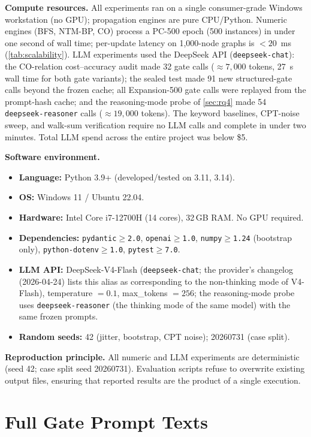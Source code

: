 \documentclass{article}
\theoremstyle{definition}
\begin{document}
\textbf{Compute resources.}  All experiments ran on a single
consumer-grade Windows workstation (no GPU); propagation engines
are pure CPU/Python.  Numeric engines (BFS, NTM-BP, CO) process a
PC-500 epoch (500 instances) in under one second of wall time;
per-update latency on 1{,}000-node graphs is $<20$~ms
(\cref{tab:scalability}).  LLM experiments used the DeepSeek
API (\texttt{deepseek-chat}): the CO-relation cost--accuracy audit made 32 gate calls
($\approx 7{,}000$ tokens, 27~s wall time for both gate variants); the
sealed test made 91 new structured-gate calls beyond the frozen cache;
all Expansion-500 gate calls were replayed from the prompt-hash cache;
and the reasoning-mode probe of \cref{sec:rq4} made 54
\texttt{deepseek-reasoner} calls ($\approx 19{,}000$ tokens).  The
keyword baselines, CPT-noise sweep, and walk-sum verification require
no LLM calls and complete in under two minutes.  Total LLM spend across
the entire project was below \$5.

\textbf{Software environment.}
\begin{itemize}
\item \textbf{Language:} Python 3.9+ (developed/tested on 3.11, 3.14).
\item \textbf{OS:} Windows 11 / Ubuntu 22.04.
\item \textbf{Hardware:} Intel Core i7-12700H (14 cores), 32\,GB RAM. No GPU required.
\item \textbf{Dependencies:} \texttt{pydantic$\ge$2.0},
  \texttt{openai$\ge$1.0}, \texttt{numpy$\ge$1.24} (bootstrap only),
  \texttt{python-dotenv$\ge$1.0}, \texttt{pytest$\ge$7.0}.
\item \textbf{LLM API:} DeepSeek-V4-Flash (\texttt{deepseek-chat}; the
  provider's changelog (2026-04-24) lists this alias as corresponding to
  the non-thinking mode of V4-Flash), temperature $=0.1$,
  max\_tokens $=256$; the reasoning-mode probe uses
  \texttt{deepseek-reasoner} (the thinking mode of the same model) with the same frozen prompts.
\item \textbf{Random seeds:} 42 (jitter, bootstrap, CPT noise);
  20260731 (case split).
\end{itemize}

\textbf{Reproduction principle.}  All numeric and LLM experiments are
deterministic (seed 42; case split seed 20260731).  Evaluation scripts
refuse to overwrite existing output files, ensuring that reported
results are the product of a single execution.

\section{Full Gate Prompt Texts}
\label{app:prompts}
\end{document}
